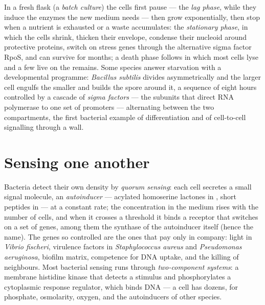 \begin{definition}\label{def:b3:bacteriology:phases}
In a fresh flask (a \emph{batch culture}) the cells first pause --- the
\emph{lag phase}, while they induce the enzymes the new medium needs
--- then grow exponentially, then stop when a nutrient is exhausted or
a waste accumulates: the \emph{stationary phase}, in which the cells
shrink, thicken their envelope, condense their nucleoid around
protective proteins, switch on stress genes through the alternative
sigma factor RpoS, and can survive for months; a death phase follows
in which most cells lyse and a few live on the remains. Some species
answer starvation with a developmental programme: \emph{Bacillus
subtilis} divides asymmetrically and the larger cell engulfs the
smaller and builds the spore around it, a sequence of eight hours
controlled by a cascade of \emph{sigma factors} --- the subunits that
direct RNA polymerase to one set of promoters --- alternating between
the two compartments, the first bacterial example of differentiation
and of cell-to-cell signalling through a wall.
\end{definition}

\section{Sensing one another}

\begin{definition}\label{def:b3:bacteriology:quorum}
Bacteria detect their own density by \emph{quorum sensing}: each cell
secretes a small signal molecule, an \emph{autoinducer} --- acylated
homoserine lactones in , short peptides in 
--- at a constant rate; the concentration in the medium rises with the
number of cells, and when it crosses a threshold it binds a receptor
that switches on a set of genes, among them the synthase of the
autoinducer itself (hence the name). The genes so controlled are the
ones that pay only in company: light in \emph{Vibrio fischeri},
virulence factors in \emph{Staphylococcus aureus} and
\emph{Pseudomonas aeruginosa}, biofilm matrix, competence for DNA
uptake, and the killing of neighbours. Most bacterial sensing runs
through \emph{two-component systems}: a membrane histidine kinase that
detects a stimulus and phosphorylates a cytoplasmic response regulator,
which binds DNA --- a cell has dozens, for phosphate, osmolarity,
oxygen, and the autoinducers of other species.
\end{definition}

